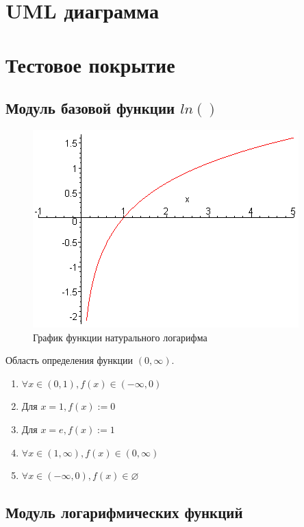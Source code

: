 \documentclass[a4paper,10pt]{article}
\begin{document}
\section*{UML диаграмма}

\section*{Тестовое покрытие}
    \subsection*{Модуль базовой функции $ln()$}
    	\begin{figure}[h!]
			\caption{График функции натурального логарифма}
			\includegraphics[scale=0.5]{./images/ln.png}
		\end{figure} 

		Область определения функции $(0, \infty)$. 
		\begin{enumerate}
			\item $\forall x \in (0, 1), f(x) \in (-\infty, 0)$
			\item $\text{Для } x = 1, f(x) := 0$
			\item $\text{Для } x = e, f(x) := 1$
			\item $\forall x \in (1, \infty), f(x) \in (0, \infty)$
			\item $\forall x \in (-\infty, 0), f(x) \in \varnothing$
		\end{enumerate}

    \subsection*{Модуль логарифмических функций}
\end{document}
